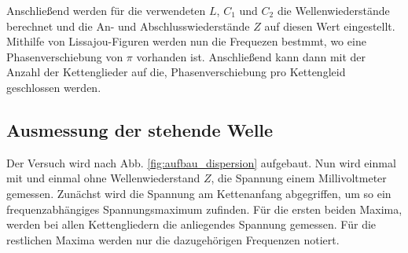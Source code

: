 Anschließend werden für die verwendeten $L$, $C_1$ und $C_2$ die Wellenwiederstände berechnet
und die An- und Abschlusswiederstände $Z$ auf diesen Wert eingestellt.
Mithilfe von Lissajou-Figuren werden nun die Frequezen bestmmt, wo eine Phasenverschiebung von $\pi$ 
vorhanden ist. Anschließend kann dann mit der Anzahl der Kettenglieder auf die, 
Phasenverschiebung pro Kettengleid geschlossen werden.

\subsection{Ausmessung der stehende Welle}
Der Versuch wird nach Abb. \ref{fig:aufbau_dispersion} aufgebaut.
Nun wird einmal mit und einmal ohne Wellenwiederstand $Z$, die Spannung einem Millivoltmeter gemessen.
Zunächst wird die Spannung am Kettenanfang abgegriffen, um so ein frequenzabhängiges Spannungsmaximum 
zufinden. Für die ersten beiden Maxima, werden bei allen Kettengliedern die anliegendes Spannung gemessen.
Für die restlichen Maxima werden nur die dazugehörigen Frequenzen notiert.
